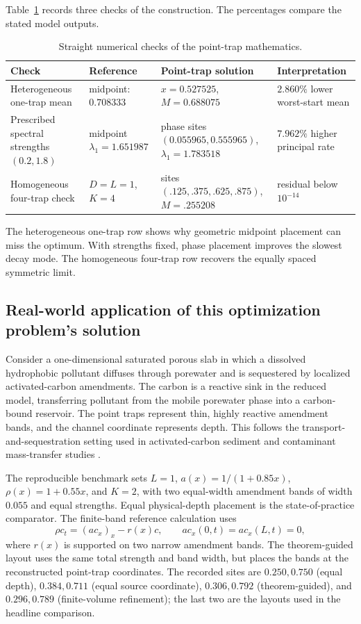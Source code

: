 \documentclass[10pt]{article}
\begin{document}
Table~\ref{tab:math-numbers} records three checks of the construction. The percentages compare the stated model outputs.

\begin{table}[htbp]
\centering
\scriptsize
\setlength{\tabcolsep}{2pt}
\caption{Straight numerical checks of the point-trap mathematics.}
\label{tab:math-numbers}
\begin{tabular}{>{\raggedright\arraybackslash}p{.25\linewidth}>{\raggedright\arraybackslash}p{.19\linewidth}>{\raggedright\arraybackslash}p{.25\linewidth}>{\raggedright\arraybackslash}p{.19\linewidth}}
\toprule
Check & Reference & Point-trap solution & Interpretation \\
\midrule
Heterogeneous one-trap mean & midpoint: $0.708333$ & $x=0.527525$, $M=0.688075$ & $2.860\%$ lower worst-start mean \\
Prescribed spectral strengths $(0.2,1.8)$ & midpoint $\lambda_1=1.651987$ & phase sites $(0.055965,0.555965)$, $\lambda_1=1.783518$ & $7.962\%$ higher principal rate \\
Homogeneous four-trap check & $D=L=1$, $K=4$ & sites $(.125,.375,.625,.875)$, $M=.255208$ & residual below $10^{-14}$ \\
\bottomrule
\end{tabular}
\end{table}

The heterogeneous one-trap row shows why geometric midpoint placement can miss the optimum. With strengths fixed, phase placement improves the slowest decay mode. The homogeneous four-trap row recovers the equally spaced symmetric limit.

\subsection{Real-world application of this optimization problem's solution}

Consider a one-dimensional saturated porous slab in which a dissolved hydrophobic pollutant diffuses through porewater and is sequestered by localized activated-carbon amendments. The carbon is a reactive sink in the reduced model, transferring pollutant from the mobile porewater phase into a carbon-bound reservoir. The point traps represent thin, highly reactive amendment bands, and the channel coordinate represents depth. This follows the transport-and-sequestration setting used in activated-carbon sediment and contaminant mass-transfer studies \cite{Ghosh2011,Werner2006}.

The reproducible benchmark sets $L=1$, $a(x)=1/(1+0.85x)$, $\rho(x)=1+0.55x$, and $K=2$, with two equal-width amendment bands of width $0.055$ and equal strengths. Equal physical-depth placement is the state-of-practice comparator. The finite-band reference calculation uses
\[
\rho c_t=(a c_x)_x-r(x)c,
\qquad
a c_x(0,t)=a c_x(L,t)=0,
\]
where $r(x)$ is supported on two narrow amendment bands. The theorem-guided layout uses the same total strength and band width, but places the bands at the reconstructed point-trap coordinates. The recorded sites are $0.250,0.750$ (equal depth), $0.384,0.711$ (equal source coordinate), $0.306,0.792$ (theorem-guided), and $0.296,0.789$ (finite-volume refinement); the last two are the layouts used in the headline comparison.
\end{document}
